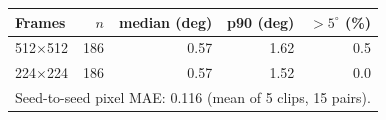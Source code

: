 \footnotesize
\begin{tabular}{lrrrr}
\toprule
Frames & $n$ & median (deg) & p90 (deg) & $>5^\circ$ (\%) \\
\midrule
512$\times$512 & 186 & 0.57 & 1.62 & 0.5 \\
224$\times$224 & 186 & 0.57 & 1.52 & 0.0 \\
\midrule
\multicolumn{5}{l}{Seed-to-seed pixel MAE: 0.116 (mean of 5 clips, 15 pairs).} \\
\bottomrule
\end{tabular}
